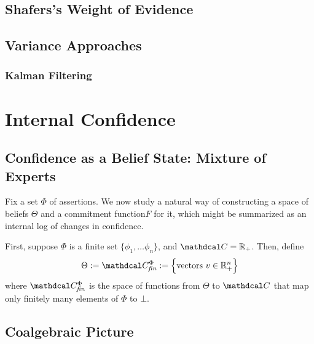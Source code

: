 \documentclass{article}
\def\cofunc{commitment function}
\def\confdom{\mathdcal C}
\def\Rplus{\mathbb R_+}
\begin{document}
\subsection{Shafers's Weight of Evidence}
\subsection{Variance Approaches}
\subsubsection{Kalman Filtering}

%
\section{Internal Confidence}

\subsection{Confidence as a Belief State: Mixture of Experts}

Fix a set $\Phi$ of assertions.
We now study a natural way of constructing a space of beliefs $\Theta$ and a \cofunc $F$ for it,
which might be summarized as an internal log of changes in confidence. 


First, suppose $\Phi$ is a finite set $\{ \phi_1, \ldots \phi_n\}$, and $\confdom = \Rplus$. 
Then, define
\begin{align*}
	\Theta := \confdom_{\mathit{fin}}^{\Phi} := 
		\Big\{ \text{vectors}~ v \in \mathbb R_+^n \Big\}
\end{align*}
where 
$\confdom_{\mathit{fin}}^\Phi$ is the space of functions from $\Theta$ to $\confdom$ that map only finitely many elements of $\Phi$ to $\bot$.





\subsection{Coalgebraic Picture}
\end{document}
